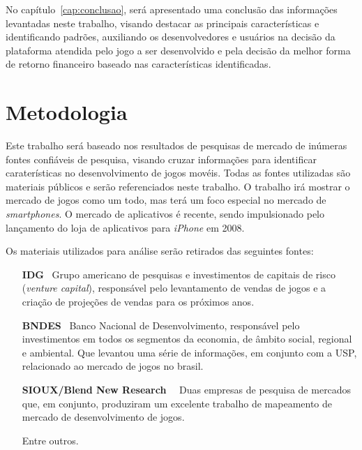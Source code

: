 No capítulo~\ref{cap:conclusao}, será apresentado uma conclusão das informações levantadas neste trabalho, visando destacar as principais características e identificando padrões, auxiliando os desenvolvedores e usuários na decisão da plataforma atendida pelo jogo a ser desenvolvido e pela decisão da melhor forma de retorno financeiro baseado nas características identificadas.



\section{Metodologia}

Este trabalho será baseado nos resultados de pesquisas de mercado de inúmeras fontes confiáveis de pesquisa, visando cruzar informações para identificar caraterísticas no desenvolvimento de jogos movéis. Todas as fontes utilizadas são materiais públicos e serão referenciados neste trabalho.\newline
O trabalho irá mostrar o mercado de jogos como um todo, mas terá um foco especial no mercado de \emph{smartphones}. O mercado de aplicativos é recente, sendo impulsionado pelo lançamento do loja de aplicativos para \emph{iPhone} em 2008.



Os materiais utilizados para análise serão retirados das seguintes fontes:


\begin{itemize}

	\item [\textbf{IDG}~\cite{idg}] Grupo americano de pesquisas e investimentos de capitais de risco (\emph{venture capital}), responsável pelo levantamento de vendas de jogos e a criação de projeções de vendas para os próximos anos.

	\item [\textbf{BNDES}~\cite{bndes}] Banco Nacional de Desenvolvimento, responsável pelo investimentos em todos os segmentos da economia, de âmbito social, regional e ambiental. Que levantou uma série de informações, em conjunto com a USP, relacionado ao mercado de jogos no brasil.
	
	\item[\textbf{SIOUX/Blend New Research}~\cite{sioux}~\cite{blend}] Duas empresas de pesquisa de mercados que, em conjunto, produziram um excelente trabalho de mapeamento de mercado de desenvolvimento de jogos.
	
	\item [Entre outros.]

\end{itemize}





